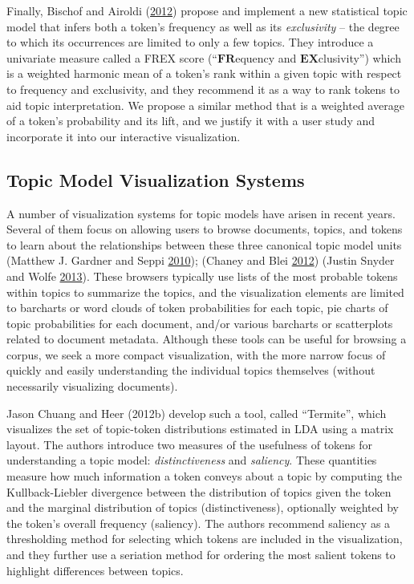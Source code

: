 \documentclass[12pt,]{isuthesis}
\begin{document}
Finally, Bischof and Airoldi (\protect\hyperlink{ref-Bischof}{2012})
propose and implement a new statistical topic model that infers both a
token's frequency as well as its \emph{exclusivity} -- the degree to
which its occurrences are limited to only a few topics. They introduce a
univariate measure called a FREX score (``\(\mathbf{FR}\)equency and
\(\mathbf{EX}\)clusivity'') which is a weighted harmonic mean of a
token's rank within a given topic with respect to frequency and
exclusivity, and they recommend it as a way to rank tokens to aid topic
interpretation. We propose a similar method that is a weighted average
of a token's probability and its lift, and we justify it with a user
study and incorporate it into our interactive visualization.

\subsection{Topic Model Visualization Systems}

A number of visualization systems for topic models have arisen in recent
years. Several of them focus on allowing users to browse documents,
topics, and tokens to learn about the relationships between these three
canonical topic model units (Matthew J. Gardner and Seppi
\protect\hyperlink{ref-Gardner}{2010}); (Chaney and Blei
\protect\hyperlink{ref-Blei-2012}{2012}) (Justin Snyder and Wolfe
\protect\hyperlink{ref-Snyder}{2013}). These browsers typically use
lists of the most probable tokens within topics to summarize the topics,
and the visualization elements are limited to barcharts or word clouds
of token probabilities for each topic, pie charts of topic probabilities
for each document, and/or various barcharts or scatterplots related to
document metadata. Although these tools can be useful for browsing a
corpus, we seek a more compact visualization, with the more narrow focus
of quickly and easily understanding the individual topics themselves
(without necessarily visualizing documents).

Jason Chuang and Heer (2012b) develop such a tool, called ``Termite'',
which visualizes the set of topic-token distributions estimated in LDA
using a matrix layout. The authors introduce two measures of the
usefulness of tokens for understanding a topic model:
\emph{distinctiveness} and \emph{saliency}. These quantities measure how
much information a token conveys about a topic by computing the
Kullback-Liebler divergence between the distribution of topics given the
token and the marginal distribution of topics (distinctiveness),
optionally weighted by the token's overall frequency (saliency). The
authors recommend saliency as a thresholding method for selecting which
tokens are included in the visualization, and they further use a
seriation method for ordering the most salient tokens to highlight
differences between topics.
\end{document}
